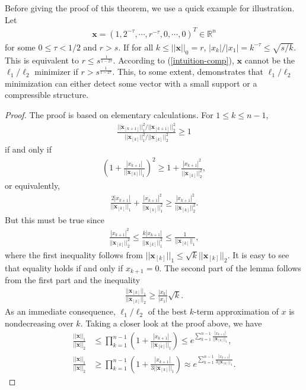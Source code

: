 \documentclass[11pt]{article}
\numberwithin{equation}{section}
\theoremstyle{plain}
\theoremstyle{definition}
\def\R{{\mathbb R}}
\def\R{{\mathbb R}}
\def\x{{\mathbf x}}
\begin{document}
Before giving the proof of this theorem, we use a quick example for illustration. Let \begin{align*}
\x=(1, 2^{-\tau}, \cdots, r^{-\tau}, 0, \cdots, 0)^T\in\R^n
\end{align*}
for some $0\leq\tau<1/2$ and $r>s$. If for all $k\leq ||\x||_0=r$, $|x_k|/|x_1|=k^{-\tau}\leq\sqrt{s/k}$. This is equivalent to $r\leq s^{\frac{1}{1-2\tau}}$. According to (\ref{intuition-comp}), $\x$ cannot be the $\ell_1/\ell_2$ minimizer if $r>s^{\frac{1}{1-2\tau}}$. This, to some extent, demonstrates that $\ell_1/\ell_2$ minimization can either detect some vector with a small support or a compressible structure.  
\begin{proof}
The proof is based on elementary calculations. For $1\leq k\leq n-1$, 
\begin{align*}
\frac{||\x_{[k+1]}||^2_1/||\x_{[k+1]}||^2_2}{||\x_{[k]}||^2_1/||\x_{[k]}||^2_2}\geq 1
\end{align*}
if and only if
\begin{align*}
\left(1+\frac{|x_{k+1}|}{||\x_{[k]}||_1}\right)^2\geq 1+\frac{|x_{k+1}|^2}{||\x_{[k]}||_2^2},
\end{align*}
or equivalently, 
\begin{align*}
\frac{2|x_{k+1}|}{||\x_{[k]}||_1}+\frac{|x_{k+1}|^2}{||\x_{[k]}||^2_1}\geq\frac{|x_{k+1}|^2}{||\x_{[k]}||_2^2}.
\end{align*}
But this must be true since
\begin{align*}
\frac{|x_{k+1}|^2}{||\x_{[k]}||_2^2}\leq\frac{k|x_{k+1}|}{||\x_{[k]}||_1^2}\leq\frac{1}{||\x_{[k]}||_1}, 
\end{align*}
where the first inequality follows from $||\x_{[k]}||_1\leq\sqrt{k}||\x_{[k]}||_2$. It is easy to see that equality holds if and only if $x_{k+1}=0$. The second part of the lemma follows from the first part and the inequality
\begin{align*}
\frac{||\x_{[k]}||_1}{||\x_{[k]}||_2}\geq\frac{|x_k|}{|x_1|}\sqrt{k}.
\end{align*}
As an immediate consequence, $\ell_1/\ell_2$ of the best $k$-term approximation of $x$ is nondecreasing over $k$. Taking a closer look at the proof above, we have 
\begin{align*}
\frac{||\x||_1}{||\x||_2}&\leq\prod_{k=1}^{n-1}\left(1+\frac{|x_{k+1}|}{||\x_{[k]}||_1}\right)\leq e^{\sum_{k=1}^{n-1}\frac{|x_{k+1}|}{||\x_{[k]}||_1}},\\
\frac{||\x||_1}{||\x||_2}&\geq\prod_{k=1}^{n-1}\left(1+\frac{|x_{k+1}|}{3||\x_{[k]}||_1}\right)\approx e^{\sum_{k=1}^{n-1}\frac{|x_{k+1}|}{3||\x_{[k]}||_1}}.
\end{align*}
\end{proof}
\end{document}
